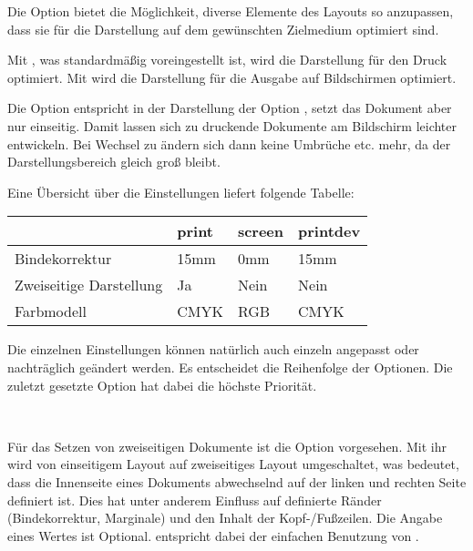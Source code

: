 \begin{Declaration}
\end{Declaration}

Die Option  bietet die Möglichkeit, diverse Elemente
des Layouts so anzupassen, dass sie für die Darstellung auf dem gewünschten
Zielmedium optimiert sind.

Mit , was standardmäßig voreingestellt ist,
wird die Darstellung für den Druck optimiert.
Mit  wird die Darstellung
für die Ausgabe auf Bildschirmen optimiert.

Die Option  entspricht in der Darstellung
der Option , setzt das Dokument aber nur einseitig.
Damit lassen sich zu druckende Dokumente am Bildschirm leichter entwickeln.
Bei Wechsel zu  ändern sich dann keine Umbrüche etc.
mehr, da der Darstellungsbereich gleich groß bleibt.

Eine Übersicht über die Einstellungen liefert folgende Tabelle:

\begin{center}
\begin{tabular}{llll}
  & \textbf{\ttfamily print} & \textbf{\ttfamily screen} & \textbf{\ttfamily printdev} \\
  \midrule
Bindekorrektur          & 15mm  & 0mm   & 15mm\\
Zweiseitige Darstellung & Ja    & Nein  & Nein\\
Farbmodell              & CMYK  & RGB   & CMYK
\end{tabular}
\end{center}

Die einzelnen Einstellungen können natürlich auch einzeln angepasst oder
nachträglich geändert werden. Es entscheidet die Reihenfolge der Optionen.
Die zuletzt gesetzte Option hat dabei die höchste Priorität.

\begin{Declaration}
  \\
\end{Declaration}

Für das Setzen von zweiseitigen Dokumente ist die Option 
vorgesehen. Mit ihr wird von einseitigem Layout auf zweiseitiges Layout
umgeschaltet, was bedeutet, dass die Innenseite eines Dokuments abwechselnd
auf der linken und rechten Seite definiert ist. Dies hat unter anderem Einfluss
auf definierte Ränder (Bindekorrektur, Marginale) und den Inhalt der
Kopf-/Fußzeilen.
Die Angabe eines Wertes ist Optional.  entspricht
dabei der einfachen Benutzung von .

